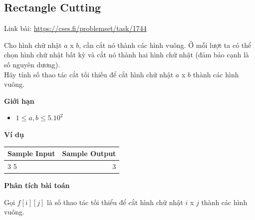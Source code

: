 \documentclass{article}
\begin{document}
\subsection{Rectangle Cutting}
Link bài: \url{https://cses.fi/problemset/task/1744}

\begin{tcolorbox}[
    colback=blue!5,        %
    colframe=blue!75!black,%
    title={Đề bài}
]
Cho hình chữ nhật $a$ x $b$, cần cắt nó thành các hình vuông. Ở mỗi lượt ta có thể chọn hình chữ nhật bất kỳ và cắt nó thành hai hình chữ nhật (đảm bảo cạnh là số nguyên dương).\\

Hãy tính số thao tác cắt tối thiếu để cắt hình chữ nhật $a$ x $b$ thành các hình vuông.
\end{tcolorbox}

\textbf{Giới hạn}
\begin{itemize}
    \item $1 \leq a, b \leq 5.10^2$
\end{itemize}

\textbf{Ví dụ}

\begin{table}[h]
    \centering
    \begin{tabular}{|l|r|}
        \hline
        \textbf{Sample Input} & \textbf{Sample Output} \\
        \hline
		3 5&3 \\ 
		\hline
    \end{tabular}
\end{table}

\textbf{Phân tích bài toán}

Gọi $f[i][j]$ là số thao tác tối thiểu để cắt hình chữ nhật $i$ x $j$ thành các hình vuông. \\
\end{document}
